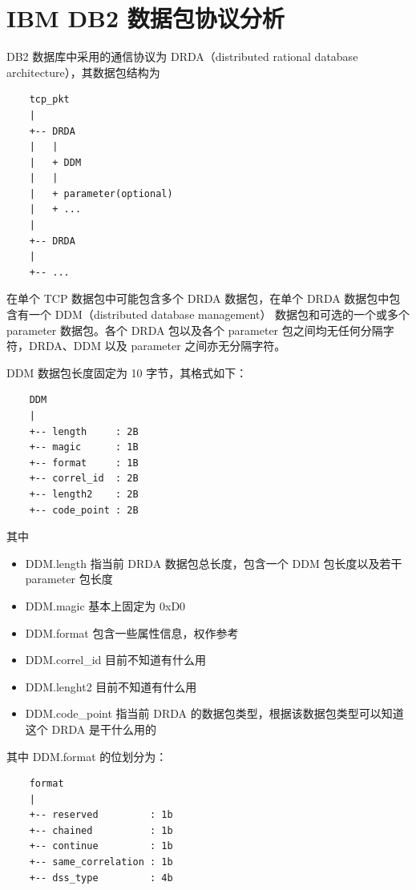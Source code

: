 \section{IBM DB2 数据包协议分析}

DB2 数据库中采用的通信协议为 DRDA（{\ef distributed rational database architecture}），其数据包结构为

\begin{lstlisting}
    tcp_pkt
    |
    +-- DRDA
    |   |
    |   + DDM
    |   |
    |   + parameter(optional)
    |   + ...
    |
    +-- DRDA
    |
    +-- ...

\end{lstlisting}

在单个 TCP 数据包中可能包含多个 {\cf DRDA} 数据包，在单个 DRDA 数据包中包含有一个 {\cf DDM}（{\ef distributed database management}） 数据包和可选的一个或多个 {\cf parameter} 数据包。各个 {\cf DRDA} 包以及各个 {\cf parameter} 包之间均无任何分隔字符，{\cf DRDA}、{\cf DDM} 以及 {\cf parameter} 之间亦无分隔字符。

{\cf DDM} 数据包长度固定为 10 字节，其格式如下：

\begin{lstlisting}
    DDM
    |
    +-- length     : 2B
    +-- magic      : 1B
    +-- format     : 1B
    +-- correl_id  : 2B
    +-- length2    : 2B
    +-- code_point : 2B
\end{lstlisting}

其中

\begin{itemize}
    \item {\cf DDM.length} 指当前 DRDA 数据包总长度，包含一个 DDM 包长度以及若干 parameter 包长度
    \item {\cf DDM.magic} 基本上固定为 0xD0
    \item {\cf DDM.format} 包含一些属性信息，权作参考
    \item {\cf DDM.correl\_id} 目前不知道有什么用
    \item {\cf DDM.lenght2} 目前不知道有什么用
    \item {\cf DDM.code\_point} 指当前 DRDA 的数据包类型，根据该数据包类型可以知道这个 DRDA 是干什么用的
\end{itemize}

其中 {\cf DDM.format} 的位划分为：

\begin{lstlisting}
    format
    |
    +-- reserved         : 1b
    +-- chained          : 1b
    +-- continue         : 1b
    +-- same_correlation : 1b
    +-- dss_type         : 4b
\end{lstlisting}

